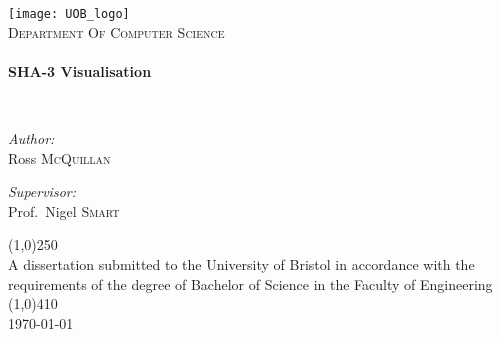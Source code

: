 \begin{titlepage}
\begin{center}

\vspace*{20px}

\texttt{[image: UOB\_logo]}
\\
\bigskip
\bigskip
\bigskip
\bigskip
\textsc{Department Of Computer Science}\\[0.5cm]

\HRule \\[0.4cm]
{ \huge \bfseries SHA-3 Visualisation \\[0.4cm] }

\HRule \\[1.5cm]

\noindent
\begin{minipage}{0.4\textwidth}
\begin{flushleft} \large
\emph{Author:}\\
Ross \textsc{McQuillan}
\end{flushleft}
\end{minipage}%
\begin{minipage}{0.4\textwidth}
\begin{flushright} \large
\emph{Supervisor:} \\
Prof.~Nigel \textsc{Smart}
\end{flushright}
\end{minipage}

\vfill

\line(1,0){250}\\
\smallskip
A dissertation submitted to the University of Bristol in accordance with the requirements
of the degree  of Bachelor of Science in the Faculty of Engineering\\
\smallskip
\line(1,0){410}\\
\bigskip
\bigskip
\bigskip
{\large \today}

\end{center}
\end{titlepage}